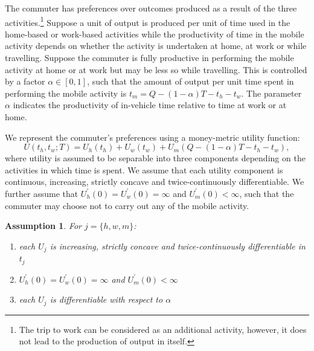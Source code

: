 \documentclass[12pt,a4paper,british]{article}
\newtheorem{assumption}{Assumption}[section]
\begin{document}
The commuter has preferences over outcomes produced as a result of the three activities.\footnote{The trip to work can be considered as an additional activity, however, it does not lead to the production of output in itself.} Suppose a unit of output is produced per unit of time used in the home-based or work-based activities while the productivity of time in the mobile activity depends on whether the activity is undertaken at home, at work or while travelling. Suppose the commuter is fully productive in performing the mobile activity at home or at work but may be less so while travelling. This is controlled by a factor $\alpha \in \left[0, 1\right]$, such that the amount of output per unit time spent in performing the mobile activity is $t_{m} = Q - \left( 1 - \alpha \right) T - t_{h}-t_{w}$. The parameter $\alpha$ indicates the productivity of in-vehicle time relative to time at work or at home.

We represent the commuter's preferences using a money-metric utility function:%
\begin{equation}
U\left(t_{h},t_{w};T\right)=U_{h}\left(t_{h}\right)+U_{w}\left(t_{w}\right)+U_{m}\left(Q-\left(1-\alpha\right)T-t_{h}-t_{w}\right),
\label{utility0}
\end{equation}
where utility is assumed to be separable into three components depending on the activities in which time is spent. We assume that each utility component is continuous, increasing, strictly concave and twice-continuously differentiable. We further assume that $U_{h}^{\prime}\left(0\right) = U_{w}^{\prime}\left(0\right) = \infty$ and $U_{m}^{\prime}\left(0\right)<\infty$, such that the commuter may choose not to carry out any of the mobile activity.

\begin{assumption}
    For $j=\{h,w,m\}$: 
    \begin{enumerate}
        \item each $U_j$ is increasing, strictly concave and twice-continuously differentiable in $t_j$
        \item $U_{h}^{\prime}\left(0\right) = U_{w}^{\prime}\left(0\right) = \infty$ and $U_{m}^{\prime}\left(0\right)<\infty$
        \item each $U_j$ is differentiable with respect to $\alpha$
    \end{enumerate}
\end{assumption}
\end{document}
